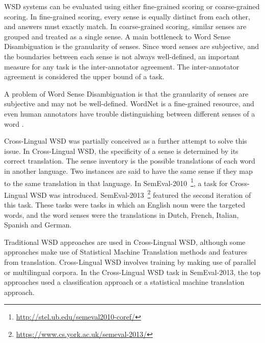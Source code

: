 WSD systems can be evaluated using either fine-grained scoring or coarse-grained scoring. In fine-grained scoring, every sense is equally distinct from each other, and answers must exactly match. In coarse-grained scoring, similar senses are grouped and treated as a single sense. A main bottleneck to Word Sense Disambiguation is the granularity of senses. Since word senses are subjective, and the boundaries between each sense is not always well-defined, an important measure for any task is the inter-annotator agreement. The inter-annotator agreement is considered the upper bound of a task. 

A problem of Word Sense Disambiguation is that the granularity of senses are subjective and may not be well-defined. WordNet is a fine-grained resource, and even human annotators have trouble distinguishing between different senses of a word \cite{edmonds2002introduction}. 

Cross-Lingual WSD was partially conceived as a further attempt to solve this issue. In Cross-Lingual WSD, the specificity of a sense is determined by its correct translation. The sense inventory is the possible translations of each word in another language. Two instances are said to have the same sense if they map to the same translation in that language. In SemEval-2010~\footnote{\url{http://stel.ub.edu/semeval2010-coref/}}, a task for Cross-Lingual WSD was introduced. SemEval-2013~\footnote{\url{https://www.cs.york.ac.uk/semeval-2013/}} featured the second iteration of this task. These tasks were tasks in which an English noun were the targeted words, and the word senses were the translations in Dutch, French, Italian, Spanish and German. 


Traditional WSD approaches are used in Cross-Lingual WSD, although some approaches make use of Statistical Machine Translation methods and features from translation. Cross-Lingual WSD involves training by making use of parallel or multilingual corpora. In the Cross-Lingual WSD task in SemEval-2013, the top approaches used a classification approach or a statistical machine translation approach. 

